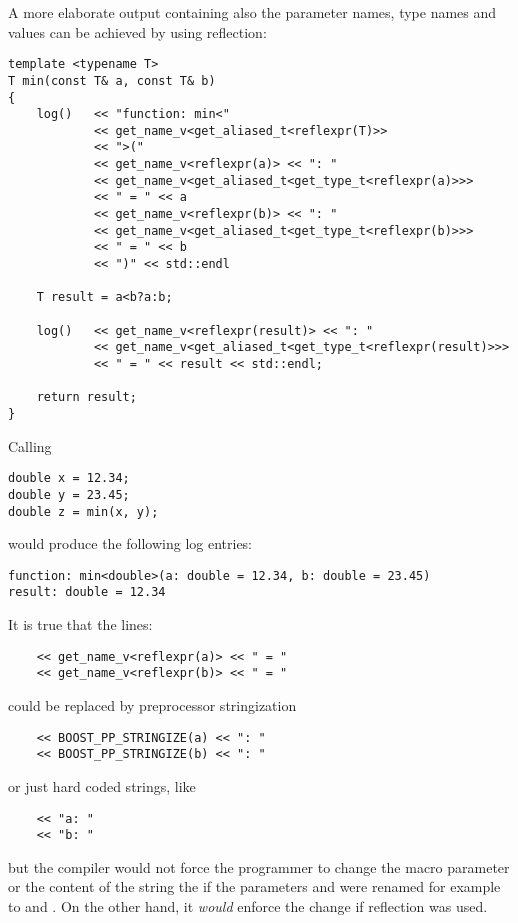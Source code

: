 A more elaborate output containing also the parameter names, type names and values
can be achieved by using reflection:

\begin{verbatim}
template <typename T>
T min(const T& a, const T& b)
{
	log()   << "function: min<"
	        << get_name_v<get_aliased_t<reflexpr(T)>>
	        << ">("
	        << get_name_v<reflexpr(a)> << ": "
	        << get_name_v<get_aliased_t<get_type_t<reflexpr(a)>>>
	        << " = " << a
	        << get_name_v<reflexpr(b)> << ": "
	        << get_name_v<get_aliased_t<get_type_t<reflexpr(b)>>>
	        << " = " << b
	        << ")" << std::endl

	T result = a<b?a:b;

	log()   << get_name_v<reflexpr(result)> << ": "
	        << get_name_v<get_aliased_t<get_type_t<reflexpr(result)>>>
	        << " = " << result << std::endl;

	return result;
}
\end{verbatim}

Calling

\begin{verbatim}
double x = 12.34;
double y = 23.45;
double z = min(x, y);
\end{verbatim}

would produce the following log entries:

\begin{verbatim}
function: min<double>(a: double = 12.34, b: double = 23.45)
result: double = 12.34
\end{verbatim}


It is true that the lines:
\begin{verbatim}
	<< get_name_v<reflexpr(a)> << " = "
	<< get_name_v<reflexpr(b)> << " = "
\end{verbatim}

could be replaced by preprocessor stringization

\begin{verbatim}
	<< BOOST_PP_STRINGIZE(a) << ": "
	<< BOOST_PP_STRINGIZE(b) << ": "
\end{verbatim}

or just hard coded strings, like

\begin{verbatim}
	<< "a: "
	<< "b: "
\end{verbatim}

but the compiler would not force the programmer to change the macro parameter
or the content of the string the if the parameters \verb@a@ and \verb@b@ were renamed
for example to \verb@first@ and \verb@second@. On the other hand, it {\em would}
enforce the change if reflection was used.

